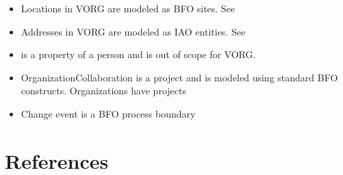 \documentclass[letterpaper,10pt,english]{sphinxmanual}
\begin{document}
\begin{itemize}
\item {} 
\sphinxAtStartPar
Locations in VORG are modeled as BFO sites.  See 

\item {} 
\sphinxAtStartPar
Addresses in VORG are modeled as IAO entities.  See 

\item {} 
\sphinxAtStartPar
{} is a property of a person and is out of scope for VORG.

\item {} 
\sphinxAtStartPar
OrganizationCollaboration is a project and is modeled using standard BFO constructs.
Organizations have  projects

\item {} 
\sphinxAtStartPar
Change event is a BFO process boundary

\end{itemize}


\section{References}
\label{\detokenize{notes-and-sources:references}}
\end{document}
